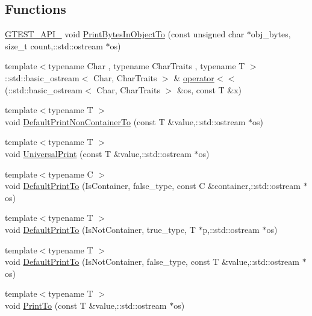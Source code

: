 \subsection*{\-Functions}
\begin{DoxyCompactItemize}
\item 
\hyperlink{gtest-port_8h_aa73be6f0ba4a7456180a94904ce17790}{\-G\-T\-E\-S\-T\-\_\-\-A\-P\-I\-\_\-} void \hyperlink{namespacetesting_1_1internal2_ae0307663d024e64f6a768500abee372a}{\-Print\-Bytes\-In\-Object\-To} (const unsigned char $\ast$obj\-\_\-bytes, size\-\_\-t count,\-::std\-::ostream $\ast$os)
\item 
{\footnotesize template$<$typename Char , typename Char\-Traits , typename T $>$ }\\\-::std\-::basic\-\_\-ostream$<$ \-Char, \*
\-Char\-Traits $>$ \& \hyperlink{namespacetesting_1_1internal2_a57051950764f935850c17ad7ae7bc65b}{operator$<$$<$} (\-::std\-::basic\-\_\-ostream$<$ \-Char, \-Char\-Traits $>$ \&os, const \-T \&x)
\item 
{\footnotesize template$<$typename T $>$ }\\void \hyperlink{namespacetesting__internal_acaa78655abf2c4f9a18daf4881b75afd}{\-Default\-Print\-Non\-Container\-To} (const \-T \&value,\-::std\-::ostream $\ast$os)
\item 
{\footnotesize template$<$typename T $>$ }\\void \hyperlink{namespacetesting_1_1internal_a72469e2fb5811a2db87e836cca5c6e00}{\-Universal\-Print} (const \-T \&value,\-::std\-::ostream $\ast$os)
\item 
{\footnotesize template$<$typename C $>$ }\\void \hyperlink{namespacetesting_1_1internal_af164e2ba546f519c73ec6be8642a6e6c}{\-Default\-Print\-To} (\-Is\-Container, false\-\_\-type, const \-C \&container,\-::std\-::ostream $\ast$os)
\item 
{\footnotesize template$<$typename T $>$ }\\void \hyperlink{namespacetesting_1_1internal_ab2ac99cb4778040ebae66e7e03dbac4f}{\-Default\-Print\-To} (\-Is\-Not\-Container, true\-\_\-type, \-T $\ast$p,\-::std\-::ostream $\ast$os)
\item 
{\footnotesize template$<$typename T $>$ }\\void \hyperlink{namespacetesting_1_1internal_afbf1973921cc068e9c18f56c6dc491c4}{\-Default\-Print\-To} (\-Is\-Not\-Container, false\-\_\-type, const \-T \&value,\-::std\-::ostream $\ast$os)
\item 
{\footnotesize template$<$typename T $>$ }\\void \hyperlink{namespacetesting_1_1internal_ab79af6a5fe031d33126ba1483d22472c}{\-Print\-To} (const \-T \&value,\-::std\-::ostream $\ast$os)

\end{DoxyCompactItemize}
